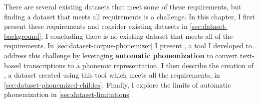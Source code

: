 There are several existing datasets that meet some of these requirements, but finding a dataset that meets all requirements is a challenge. In this chapter, I first present these requirements and consider existing datasets in \cref{sec:dataset-background}. I concluding there is no existing dataset that meets all of the requirements. In \cref{sec:dataset-corpus-phonemizer} I present \corpusphonemizer, a tool I developed to address this challenge by leveraging \textbf{automatic phonemization} to convert text-based transcriptions to a phonemic representation. I then describe the creation of \phonemizedchildes, a dataset created using this tool which meets all the requirements, in \cref{sec:dataset-phonemized-childes}. Finally, I explore the limits of automatic phonemization in \cref{sec:dataset-limitations}.





